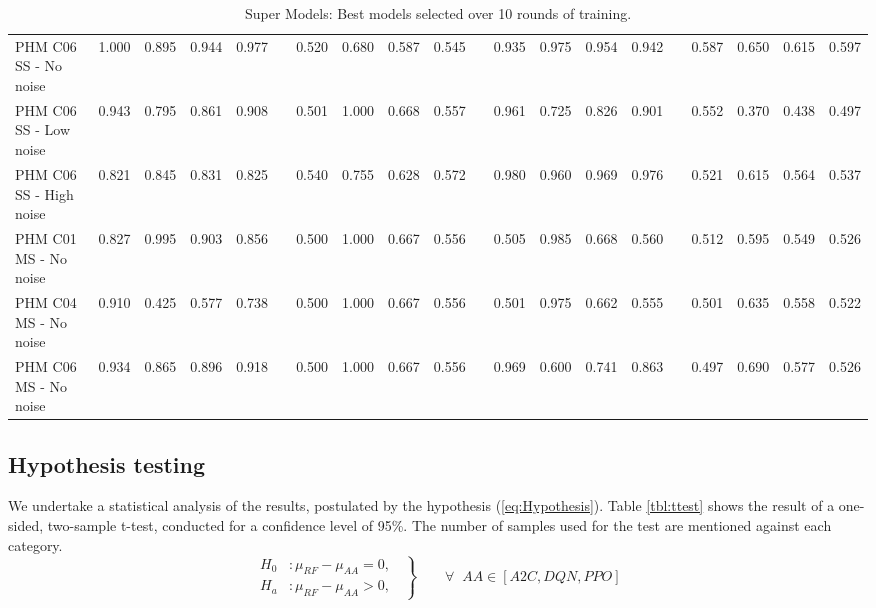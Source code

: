 \documentclass[a4paper, 12pt]{article}
\begin{document}
\begin{landscape}
\begin{table}
\begin{tabular}{@{}l rrrr c rrrr c rrrr c rrrr@{}}
			PHM C06 SS - No noise &1.000 &0.895 &0.944 & 0.977 & & 0.520 &0.680 &0.587 &0.545 & &0.935 &0.975 &0.954 &0.942 & &0.587 &0.650 &0.615&0.597\\
			PHM C06 SS - Low noise &0.943 &0.795 &0.861 & 0.908 & & 0.501 &1.000 &0.668 &0.557 & &0.961 &0.725 &0.826 &0.901 & &0.552 &0.370 &0.438&0.497\\
			PHM C06 SS - High noise &0.821 &0.845 &0.831 & 0.825 & & 0.540 &0.755 &0.628 &0.572 & &0.980 &0.960 &0.969 &0.976 & &0.521 &0.615 &0.564&0.537\\\midrule
			
			PHM C01 MS - No noise &0.827 &0.995 &0.903 & 0.856 & & 0.500 &1.000 &0.667 &0.556 & &0.505 &0.985 &0.668 &0.560 & &0.512 &0.595 &0.549&0.526\\
			PHM C04 MS - No noise &0.910 &0.425 &0.577 & 0.738 & & 0.500 &1.000 &0.667 &0.556 & &0.501 &0.975 &0.662 &0.555 & &0.501 &0.635 &0.558&0.522\\
			PHM C06 MS - No noise &0.934 &0.865 &0.896 & 0.918 & & 0.500 &1.000 &0.667 &0.556 & &0.969 &0.600 &0.741 &0.863 & &0.497 &0.690 &0.577&0.526\\			
			\bottomrule
		\end{tabular}
		\caption{Super Models: Best models selected over 10 rounds of training.}
		\label{tbl:SuperModels}
	\end{table}
\end{landscape}
\restoregeometry %

\subsection{Hypothesis testing}
We undertake a statistical analysis of the results, postulated by the hypothesis (\ref{eq:Hypothesis}). Table \ref{tbl:ttest} shows the result of a one-sided, two-sample t-test, conducted for a confidence level of 95\%. The number of samples used for the test are mentioned against each category.
\begin{equation}
	\left.\begin{aligned}
		H_0 & : \mu_{RF} - \mu_{AA} = 0,\;\; \\
		H_a & : \mu_{RF} - \mu_{AA} > 0, \;\;
	\end{aligned}
	\right\}
	\qquad \forall \;\; \text{$AA \in[A2C, DQN, PPO]$}
	\label{eq:Hypothesis}
\end{equation}
\end{document}

